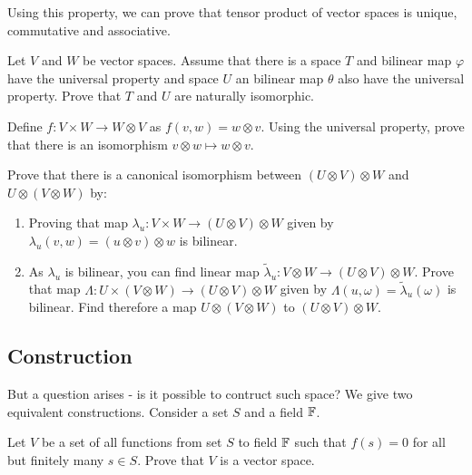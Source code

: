 \begin{figure}
  \centering
\end{figure}

Using this property, we can prove that tensor product of vector spaces is unique, commutative and associative.

\begin{prob}
  Let $V$ and $W$ be vector spaces. Assume that there is a space $T$ and bilinear map $\varphi$ have the universal property and space $U$ an bilinear map $\theta$ also have
  the universal property. Prove that $T$ and $U$ are naturally isomorphic.
\end{prob}

\begin{prob}
  Define $f:V\times W\to W\otimes V$ as $f(v,w)=w\otimes v$. Using the universal property, prove that there is an isomorphism $v\otimes w\mapsto w \otimes v$.
\end{prob}

\begin{prob}
  Prove that there is a canonical isomorphism between $(U\otimes V)\otimes W$ and $U\otimes (V\otimes W)$ by:
  \begin{enumerate}
    \item Proving that map $\lambda_u : V\times W\to (U\otimes V)\otimes W$ given by $\lambda_u(v,w)=(u\otimes v)\otimes w$ is bilinear.
    \item As $\lambda_u$ is bilinear, you can find linear map $\tilde \lambda_u: V\otimes W\to (U\otimes V)\otimes W$. Prove that map
      $\Lambda : U\times (V\otimes W)\to (U\otimes V)\otimes W$ given by $\Lambda (u, \omega)=\tilde\lambda_u(\omega)$ is bilinear. Find therefore a map
      $U\otimes (V\otimes W)$ to $(U\otimes V)\otimes W$.
  \end{enumerate}
\end{prob}

\subsection{Construction}
But a question arises - is it possible to contruct such space? We give two equivalent constructions. Consider a set $S$ and a field $\mathbb F$.
\begin{prob}
  Let $V$ be a set of all functions from set $S$ to field $\mathbb F$ such that $f(s)=0$ for all but finitely many $s\in S$. Prove that $V$ is a vector space.
\end{prob}

